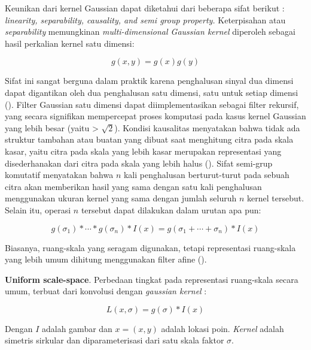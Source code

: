 Keunikan dari kernel Gaussian dapat diketahui dari beberapa sifat berikut : 
\emph{linearity, separability, causality, and semi group property.} Keterpisahan 
atau \emph{separability} memungkinan \emph{multi-dimensional Gaussian kernel} diperoleh sebagai hasil perkalian kernel satu dimensi:

\begin{equation*}
  g(x,y) = g(x)g(y)
\end{equation*}

Sifat ini sangat berguna dalam praktik karena penghalusan sinyal dua dimensi dapat digantikan oleh dua penghalusan satu dimensi, satu untuk setiap dimensi (\cite[hlm. 92]{Lowe2004}). 
Filter Gaussian satu dimensi dapat diimplementasikan sebagai filter rekursif, yang secara signifikan mempercepat proses 
komputasi pada kasus kernel Gaussian yang lebih besar (yaitu > \( \sqrt{2}\)). 
Kondisi kausalitas menyatakan bahwa tidak ada struktur tambahan atau buatan yang dibuat saat menghitung citra pada skala kasar, 
yaitu citra pada skala yang lebih kasar merupakan representasi yang disederhanakan dari citra pada skala yang lebih halus (\cite[hlm. 13--14]{mikolajczyk:tel-00584096}). 
Sifat semi-grup komutatif menyatakan bahwa \(n\) kali penghalusan berturut-turut pada sebuah citra akan memberikan hasil yang sama dengan satu kali penghalusan menggunakan ukuran kernel yang sama dengan jumlah seluruh \(n\) kernel tersebut. 
Selain itu, operasi \(n\) tersebut dapat dilakukan dalam urutan apa pun:

\begin{equation*}
g(\sigma_{1}) * \cdots * g(\sigma_{n}) * I(x) = g(\sigma_{1} + \cdots + \sigma_{n}) * I(x)
\end{equation*}

Biasanya, ruang-skala yang seragam digunakan, tetapi representasi ruang-skala yang lebih umum dihitung menggunakan filter afine (\cite[hlm. 14--15]{mikolajczyk:tel-00584096}).

\textbf{Uniform scale-space}. Perbedaan tingkat pada representasi ruang-skala secara umum, terbuat dari konvolusi dengan \emph{gaussian kernel} :

\begin{equation}
L(x,\sigma) = g(\sigma) * I(x)
\label{eq:konvolusi}
\end{equation}

Dengan \(I\) adalah gambar dan \(x = (x,y)\) adalah lokasi poin.
\emph{Kernel} adalah simetris sirkular dan diparameterisasi dari satu skala faktor \(\sigma \).

